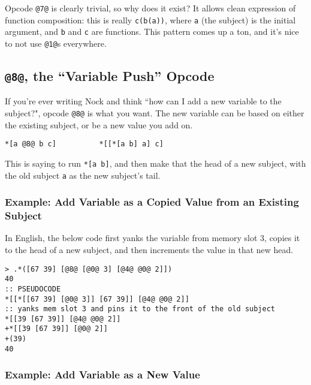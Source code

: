 \documentclass[twoside]{article}
\begin{document}
Opcode \lstinline[style=inlinecode]{@7@} is clearly trivial, so why does it exist? It allows clean expression of function composition: this is really \lstinline[style=inlinecode]{c(b(a))}, where \lstinline[style=inlinecode]{a} (the subject) is the initial argument, and \lstinline[style=inlinecode]{b} and \lstinline[style=inlinecode]{c} are functions. This pattern comes up a ton, and it's nice to not use \lstinline[style=inlinecode]{@1@}s everywhere.

\subsection{\lstinline[style=inlinecode]{@8@}, the “Variable Push” Opcode}

If you're ever writing Nock and think ``how can I add a new variable to the subject?", opcode \lstinline[style=inlinecode]{@8@} is what you want. The new variable can be based on either the existing subject, or be a new value you add on.

\begin{lstlisting}[style=listingcode]
*[a @8@ b c]          *[[*[a b] a] c]
\end{lstlisting}

This is saying to run \lstinline[style=inlinecode]{*[a b]}, and then make that the head of a new subject, with the old subject \lstinline[style=inlinecode]{a} as the new subject's tail.

\subsubsection{Example: Add Variable as a Copied Value from an Existing Subject}

In English, the below code first yanks the variable from memory slot 3, copies it to the head of a new subject, and then increments the value in that new head.

\begin{lstlisting}[style=listingcode]
> .*([67 39] [@8@ [@0@ 3] [@4@ @0@ 2]])
40
:: PSEUDOCODE
*[[*[[67 39] [@0@ 3]] [67 39]] [@4@ @0@ 2]]
:: yanks mem slot 3 and pins it to the front of the old subject
*[[39 [67 39]] [@4@ @0@ 2]]
+*[[39 [67 39]] [@0@ 2]]
+(39)
40
\end{lstlisting}

\subsubsection{Example: Add Variable as a New Value}
\end{document}
